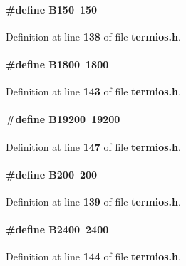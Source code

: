 \paragraph[{B150}]{\setlength{\rightskip}{0pt plus 5cm}\#define B150~150}\label{termios_8h_a7b3492c3ee457b7f2ad6a25b68a94c83}


Definition at line {\bf 138} of file {\bf termios.\+h}.

\paragraph[{B1800}]{\setlength{\rightskip}{0pt plus 5cm}\#define B1800~1800}\label{termios_8h_a0471795ca9c160facfbd0e45f58dee42}


Definition at line {\bf 143} of file {\bf termios.\+h}.

\paragraph[{B19200}]{\setlength{\rightskip}{0pt plus 5cm}\#define B19200~19200}\label{termios_8h_ae9baab0dacc8d414681e1cb5c354a058}


Definition at line {\bf 147} of file {\bf termios.\+h}.

\paragraph[{B200}]{\setlength{\rightskip}{0pt plus 5cm}\#define B200~200}\label{termios_8h_a9c03105c34cd5fa8dd83c6e3abc7f699}


Definition at line {\bf 139} of file {\bf termios.\+h}.

\paragraph[{B2400}]{\setlength{\rightskip}{0pt plus 5cm}\#define B2400~2400}\label{termios_8h_af5bd4045b436cba08feb96e15994c04b}


Definition at line {\bf 144} of file {\bf termios.\+h}.

